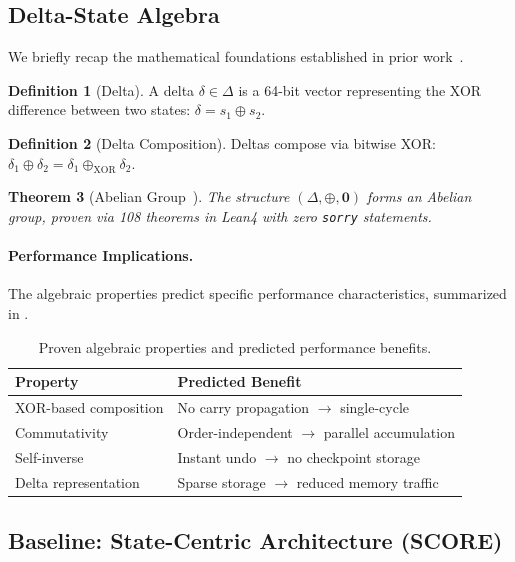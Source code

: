 \documentclass[11pt,letterpaper]{article}
\theoremstyle{plain}
\newtheorem{theorem}{Theorem}[section]
\theoremstyle{definition}
\newtheorem{definition}[theorem]{Definition}
\theoremstyle{remark}
\newcommand{\dcompose}{\oplus}
\newcommand{\dzero}{\mathbf{0}}
\newcommand{\score}{\textsc{SCORE}}
\begin{document}
\subsection{Delta-State Algebra}

We briefly recap the mathematical foundations established in prior work~\cite{paper1}.

\begin{definition}[Delta]
A delta $\delta \in \Delta$ is a 64-bit vector representing the XOR difference between two states: $\delta = s_1 \oplus s_2$.
\end{definition}

\begin{definition}[Delta Composition]
Deltas compose via bitwise XOR: $\delta_1 \dcompose \delta_2 = \delta_1 \oplus_{\text{XOR}} \delta_2$.
\end{definition}

\begin{theorem}[Abelian Group~\cite{paper1}]
\label{thm:abelian}
The structure $(\Delta, \dcompose, \dzero)$ forms an Abelian group, proven via 108 theorems in Lean4 with zero \texttt{sorry} statements.
\end{theorem}

\paragraph{Performance Implications.} The algebraic properties predict specific performance characteristics, summarized in .

\begin{table}[!htbp]
\centering
\caption{Proven algebraic properties and predicted performance benefits.}
\label{tab:properties}
\begin{tabular}{@{}ll@{}}
\toprule
\textbf{Property} & \textbf{Predicted Benefit} \\
\midrule
XOR-based composition & No carry propagation $\rightarrow$ single-cycle \\
Commutativity & Order-independent $\rightarrow$ parallel accumulation \\
Self-inverse & Instant undo $\rightarrow$ no checkpoint storage \\
Delta representation & Sparse storage $\rightarrow$ reduced memory traffic \\
\bottomrule
\end{tabular}
\end{table}

\subsection{Baseline: State-Centric Architecture (\score{})}
\end{document}
